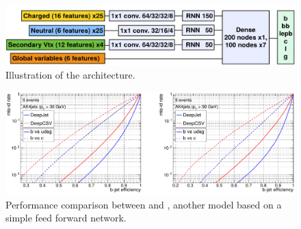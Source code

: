 \begin{figure}[H]
    \centering
    \includegraphics[width=0.75\linewidth]{fig//chap04-reco/deepjet.png}
    \caption{Illustration of the \DeepJet architecture. \cite{Bols2020JetDeepJet}}
    \label{fig:DeepJet}
\end{figure}
\begin{figure}[H]
    \centering
    \includegraphics[width=\linewidth]{fig//chap04-reco/bjet.png}
    \caption{Performance comparison between \DeepJet and \DeepCSV, another model based on a simple feed forward network. \cite{Bols2020JetDeepJet}}
    \label{fig:btag_perform}
\end{figure}



